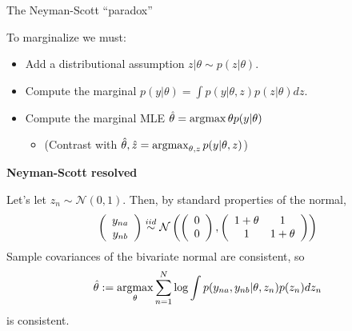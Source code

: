 \begin{frame}{The Neyman-Scott ``paradox''}

To marginalize we must:

\begin{itemize}
\item Add a distributional assumption $z | \theta \sim p(z \vert \theta)$.
\item Compute the marginal $p(y | \theta) = \int p(y | \theta, z) p(z \vert \theta) d z$.
\item Compute the marginal MLE $\hat\theta = \operatorname*{\mathrm{argmax}}{\theta} p(y | \theta)$
\begin{itemize}
    \item (Contrast with $\hat\theta, \hat{z} = \operatorname*{\mathrm{argmax}}_{\theta, z} p(y | \theta, z)$)
\end{itemize}
\end{itemize}


\textbf{Neyman-Scott resolved}

Let's let $z_n \sim \mathcal{N}(0, 1)$.  Then, by standard properties of the
normal,
%
\begin{align*}
%
\left(
\begin{array}{c}
    y_{na} \\
    y_{nb}
\end{array}
\right)
\iid
\mathcal{N}\left(
\left(
\begin{array}{c}
    0 \\
    0
\end{array}
\right),
%
\left(
\begin{array}{cc}
    1 + \theta& 1 \\
    1& 1 + \theta \\
\end{array}
\right)
%
\right)
%
\end{align*}
%
Sample covariances of the bivariate normal are consistent, so
%
\begin{align*}
%
\thetahat := \argmax_\theta \sumn \log \int p(y_{na}, y_{nb} | \theta, z_n) p(z_n) dz_n
%
\end{align*}
%
is consistent.





\end{frame}
